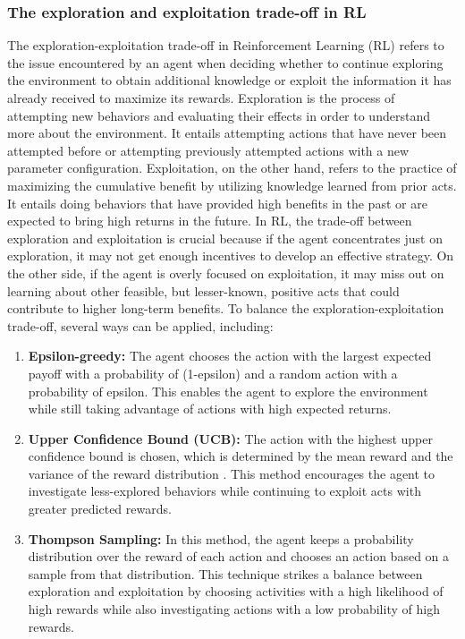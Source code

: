 \documentclass[12pt,oneside]{article}
\begin{document}
\subsubsection{The exploration and exploitation trade-off in RL}
The exploration-exploitation trade-off in Reinforcement Learning (RL) refers to the issue encountered by an agent when deciding whether to continue exploring the environment to obtain additional knowledge or exploit the information it has already received to maximize its rewards.
Exploration is the process of attempting new behaviors and evaluating their effects in order to understand more about the environment. It entails attempting actions that have never been attempted before or attempting previously attempted actions with a new parameter configuration. Exploitation, on the other hand, refers to the practice of maximizing the cumulative benefit by utilizing knowledge learned from prior acts. It entails doing behaviors that have provided high benefits in the past or are expected to bring high returns in the future.
In RL, the trade-off between exploration and exploitation is crucial because if the agent concentrates just on exploration, it may not get enough incentives to develop an effective strategy. On the other side, if the agent is overly focused on exploitation, it may miss out on learning about other feasible, but lesser-known, positive acts that could contribute to higher long-term benefits.
To balance the exploration-exploitation trade-off, several ways can be applied, including:
\begin{enumerate}
\item\label{epsilon-greedy} \textbf{Epsilon-greedy:} The agent chooses the action with the largest expected payoff with a probability of (1-epsilon) and a random action with a probability of epsilon. This enables the agent to explore the environment while still taking advantage of actions with high expected returns.
\item \textbf{Upper Confidence Bound (UCB):} The action with the highest upper confidence bound is chosen, which is determined by the mean reward and the variance of the reward distribution \cite{50_kaufmann2012bayesian}. This method encourages the agent to investigate less-explored behaviors while continuing to exploit acts with greater predicted rewards.
\item \textbf{Thompson Sampling:} In this method, the agent keeps a probability distribution over the reward of each action and chooses an action based on a sample from that distribution. This technique strikes a balance between exploration and exploitation by choosing activities with a high likelihood of high rewards while also investigating actions with a low probability of high rewards.
\end{enumerate}
\end{document}
